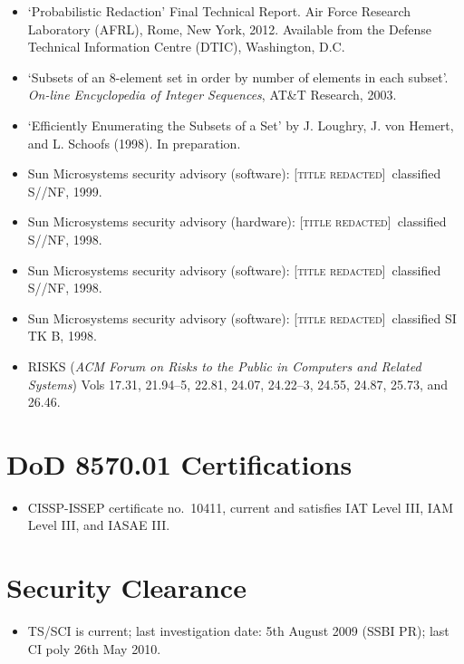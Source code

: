 \documentclass[letterpaper]{article}
\newcommand{\redacted}{\textsc{[title redacted]}}
\begin{document}
\begin{itemize}
	\item `Probabilistic Redaction' Final Technical Report. Air Force Research
		Laboratory (AFRL), Rome, New York, 2012.  Available from the Defense Technical
		Information Centre (DTIC), Washington, D.C.

	\item `Subsets of an 8-element set in order by number of elements in each
		subset'. \emph{On-line Encyclopedia of Integer Sequences}, AT\&T Research, 2003.

	\item `Efficiently Enumerating the Subsets of a Set' by J. Loughry, J. von Hemert,
		and L. Schoofs (1998).  In preparation.

    \item Sun Microsystems security advisory (software): \redacted\ classified S//NF, 1999.
	\item Sun Microsystems security advisory (hardware): \redacted\ classified S//NF, 1998.
	\item Sun Microsystems security advisory (software): \redacted\ classified S//NF, 1998.
	\item Sun Microsystems security advisory (software): \redacted\ classified SI TK B, 1998.

    \item RISKS (\emph{ACM Forum on Risks to the Public in Computers
    and Related Systems}) Vols 17.31, 21.94--5, 22.81, 24.07,
    24.22--3, 24.55, 24.87, 25.73, and 26.46.

\end{itemize}

\section*{DoD 8570.01 Certifications}

\begin{itemize}
	\item CISSP-ISSEP certificate no.\ 10411, current and satisfies IAT Level III,
		IAM Level III, and IASAE III.
\end{itemize}

\section*{Security Clearance}

\begin{itemize}
	\item TS/SCI is current; last investigation date: 5th August 2009 (SSBI PR);
		last CI poly 26th May 2010.
\end{itemize}
\end{document}
